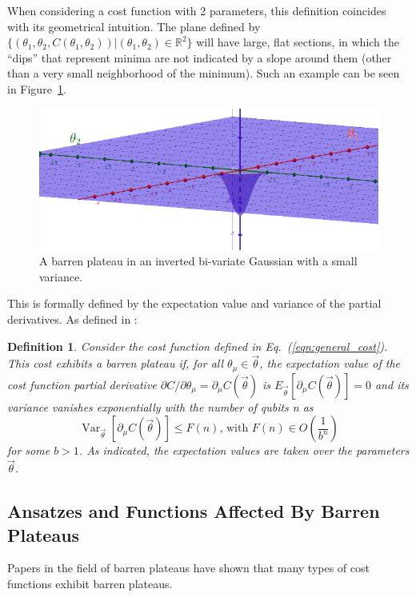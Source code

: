 \documentclass[a4paper,12pt]{article}
\newcommand{\thetas}{\vec{\theta}}
\newcommand{\del}{\partial}
\DeclareMathOperator{\Var}{Var}
\newtheorem{definition}{Definition}
\begin{document}
When considering a cost function with 2 parameters, this definition coincides with its geometrical intuition. The plane defined by $\{(\theta_1, \theta_2, C(\theta_1, \theta_2)) | (\theta_1, \theta_2) \in \mathbb{R}^2\}$ will have large, flat sections, in which the ``dips'' that represent minima are not indicated by a slope around them (other than a very small neighborhood of the minimum). Such an example can be seen in Figure~\ref{fig:bp}.

\begin{figure}[h]
    \centering
    \captionsetup{justification=centering, margin=1cm}
    \includegraphics[scale=0.5]{bp_3d.png}
    \caption{A barren plateau in an inverted bi-variate Gaussian with a small variance.}
    \label{fig:bp}
\end{figure}

This is formally defined by the expectation value and variance of the partial derivatives.
As defined in \cite{arrasmith_effect_2021}:

\begin{definition} \label{def:bp}
    Consider the cost function defined in Eq.~(\ref{eqn:general_cost}). This cost exhibits a barren plateau if, for all $\theta_\mu \in \thetas$, the expectation value of the cost function partial derivative
    $\del C / \del\theta_\mu = \del_\mu C(\thetas)$
    is
    $E_{\thetas}[\del_\mu C(\thetas)] = 0$
    and its variance vanishes exponentially with the number of qubits n as 
    \begin{equation} \label{eqn:vanishing}
        \Var_{\thetas}[\del_\mu C(\thetas)] \leq F(n) \textrm{,   with   }F(n) \in O\left(\frac{1}{b^n}\right)
    \end{equation}
    for some $b > 1$. As indicated, the expectation values are taken over the parameters $\thetas$.
\end{definition}

\subsection{Ansatzes and Functions Affected By Barren Plateaus}
Papers in the field of barren plateaus have shown that many types of cost functions exhibit barren plateaus.
\end{document}
